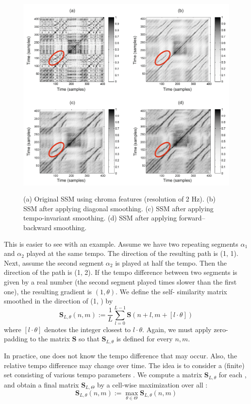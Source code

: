 \documentclass[a4paper, 9pt, twocolumn]{extarticle}
\begin{document}
\begin{figure}[h]
  \includegraphics[width=\linewidth]{images/ssmPathSmoothing.png}
  \label{fig:ssmPathSmoothing}
	\begin{center}
		\caption{(a) Original SSM using chroma features (resolution of 2 Hz). (b) SSM after applying diagonal smoothing. (c) SSM after applying tempo-invariant smoothing. (d) SSM after applying forward–backward smoothing.}
	\end{center}
\end{figure}

This is easier to see with an example. Assume we have  two repeating segments $\alpha_{1}$ and $\alpha_{2}$ played at the same tempo. The direction of the resulting path is (1, 1). Next, assume the second segment $\alpha_{2}$ is played at half the tempo. Then the direction of the path is (1, 2). If the tempo difference between two segments is given by a real number  \theta (the second segment played \theta times slower than the first one), the resulting gradient is $(1,\theta)$. We define the self- similarity matrix smoothed in the direction of (1, \theta) by
\[\textbf{S}_{L,\theta}(n,m):=\frac{1}{L}\sum_{l=0}^{L-1}\textbf{S}(n+l,m+[l·\theta])\]
where $[l·\theta]$ denotes the integer closest to $l·\theta$. Again, we must apply zero-padding to the matrix $\textbf{S}$ so that $\textbf{S}_{L,\theta}$ is defined for every $n,m$.

In practice, one does not know the tempo difference that may occur.  Also, the relative tempo difference may change over time. The idea is to consider a (finite) set \Theta  consisting of various tempo parameters \theta. We compute a matrix $\textbf{S}_{L,\theta}$ for each \theta, and obtain a final matrix $\textbf{S}_{L,\Theta}$ by a cell-wise maximization over all \theta: 
\[\textbf{S}_{L,\theta}(n,m):=\max_{\theta\in\Theta}\textbf{S}_{L,\theta}(n,m)\]
\end{document}
